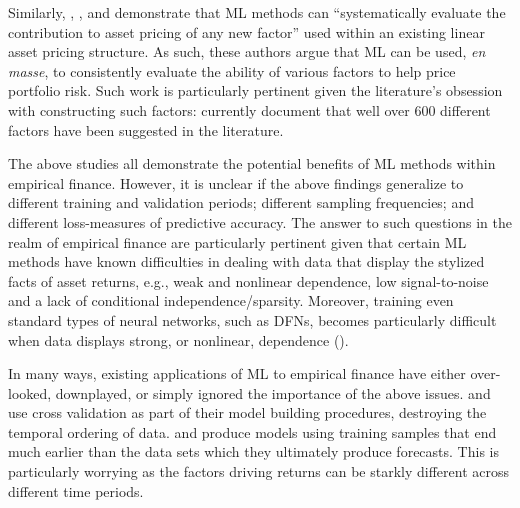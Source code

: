\documentclass{article}
\begin{document}
Similarly, \cite{kozak_shrinking_2017}, \cite{freyberger_dissecting_2017}, \cite{feng_taming_2019} and \cite{rapach_forecasting_2013} demonstrate that ML methods can ``systematically evaluate the contribution to asset pricing of any new factor'' used within an existing linear asset pricing structure. %
As such, these authors argue that ML can be used, \textit{en masse}, to consistently evaluate the ability of various factors to help price portfolio risk. Such work is particularly pertinent given the literature's obsession with constructing such factors: \cite{harvey_census_2019} currently document that well over 600 different factors have been suggested in the literature. 

The above studies all demonstrate the potential benefits of ML methods within empirical finance. However, it is unclear if the above findings generalize to different training and validation periods; different sampling frequencies; and different loss-measures of predictive accuracy. The answer to such questions in the realm of empirical finance are particularly pertinent given that certain ML methods have known difficulties in dealing with data that display the stylized facts of asset returns, e.g., weak and nonlinear dependence, low signal-to-noise and a lack of conditional independence/sparsity. Moreover, training even standard types of neural networks, such as DFNs, becomes particularly difficult when data displays strong, or nonlinear, dependence (\cite{bengio_learning_1994}). 

In many ways, existing applications of ML to empirical finance have either over-looked, downplayed, or simply ignored the importance of the above  issues. \cite{messmer_deep_2017} and \cite{feng_deep_2018} use cross validation as part of their model building procedures, destroying the temporal ordering of data. \cite{gu_empirical_2019} and \cite{messmer_deep_2017} produce models using training samples that end much earlier than the data sets which they ultimately produce forecasts. %
This is particularly worrying as the factors driving returns can be starkly different across different time periods. %
\end{document}
